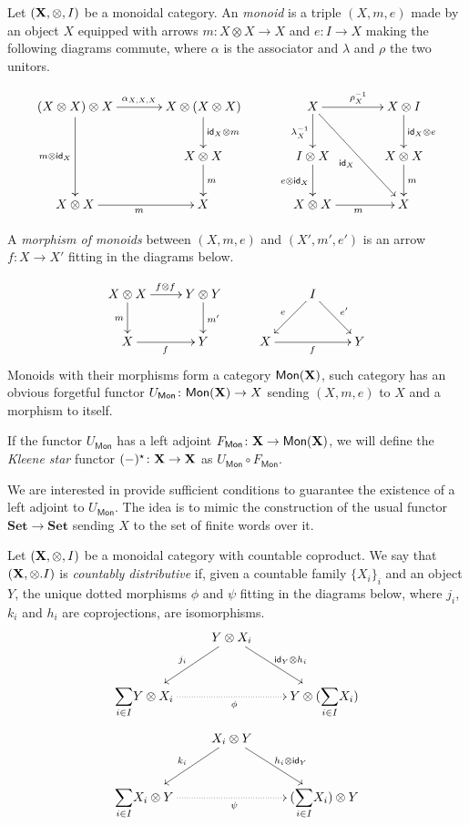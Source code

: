 \documentclass[runningheads,envcountsect]{llncs}
\newcommand{\Set}{\mathbf{Set}}
\def\X{\textbf {\textup{X}}}
\newcommand{\catname}[1]{\textbf{\textup{#1}}}
\newcommand{\mono}[1]{\mathsf{Mon}(\catname{#1})}
\newcommand{\mo}[1]{{#1}_\mathsf{Mon}}
\newcommand{\Sum}{\mathlarger{\sum}}
\newcommand{\id}[1]{\mathsf{id}_{#1}}
\begin{document}
\begin{definition}
	Let $(\X, \otimes, I)$ be a monoidal category. An \emph{monoid} is a triple $(X, m, e)$ made by an object $X$ equipped with arrows $m\colon X\otimes X\to X$ and $e\colon I\to X$ making the following diagrams commute, where $\alpha$ is the associator and $\lambda$ and $\rho$ the two unitors.
	
	\[\xymatrix@C=35pt{(X\otimes X) \ar[r]^{\alpha_{X, X, X}} \ar[dd]_{m\otimes \id{X}}\otimes X & X\otimes (X\otimes X) \ar[d]^{\id{X}\otimes m} & X \ar[r]^{\rho^{-1}_X}  \ar[d]_{\lambda^{-1}_X} \ar[ddr]_{\id{X}}& X\otimes I \ar[d]^{\id{X}\otimes e}\\& X\otimes X \ar[d]^{m}  & I\otimes X \ar[d]_{e\otimes \id{X}} & X\otimes X \ar[d]^{m} \\X\otimes X  \ar[r]_{m}& X & X\otimes X \ar[r]_{m} & X}\]
	
	A \emph{morphism of monoids} between $(X, m, e)$ and $(X', m', e')$ is an arrow $f\colon X\to X'$ fitting in the diagrams below.
	
	\[\xymatrix{X\otimes X \ar[r]^{f\otimes f} \ar[d]_{m}& Y\otimes Y \ar[d]^{m'} && I\ar[dr]^{e'} \ar[dl]_{e}\\ X\ar[r]_{f} & Y & X \ar[rr]_{f} && Y }\]
Monoids with their morphisms form a category $\mono{X}$, such category has an obvious forgetful functor $\mo{U}\colon\mono{X}\to X$ sending $(X, m, e)$ to $X$ and a morphism to itself.

If the functor $\mo{U}$ has a left adjoint $\mo{F}\colon \X\to \mono{\X}$, we will define the \emph{Kleene star} functor $(-)^\star\colon \X \to \X$ as $\mo{U}\circ \mo{F}$.
\end{definition}



We are interested in provide sufficient conditions to guarantee the existence of a left adjoint to $\mo{U}$. The idea is to mimic the construction of the usual functor $\Set\to \Set$ \cite{sakarovitch2009elements} sending $X$ to the set of finite words over it.


\begin{definition}
	Let $(\X, \otimes, I )$ be  a monoidal category with countable coproduct. We say that $(\X, \otimes. I)$ is \emph{countably distributive} if, given a countable family $\{X_i\}_{i}$ and an object $Y$, the unique dotted morphisms $\phi$ and $\psi $ fitting in the diagrams below, where $j_i$, $k_i$ and $h_i$ are coprojections, are isomorphisms.
	\[\xymatrix{&Y\otimes X_i \ar[dl]_{j_i} \ar[dr]^{\id{Y}\otimes h_i} \\ \Sum_{i\in I} Y\otimes X_i \ar@{.>}[rr]_{\phi}&& Y\otimes (\Sum_{i\in I}X_i) }\]
	\[\xymatrix{&X_i \otimes Y \ar[dl]_{k_i} \ar[dr]^{ h_i \otimes \id{Y}} \\ \Sum_{i\in I}  X_i \otimes Y \ar@{.>}[rr]_{\psi}&&  (\Sum_{i\in I}X_i) \otimes Y}\]
\end{definition}
\end{document}
